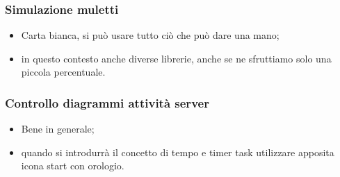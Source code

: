     \subsubsection{Simulazione muletti}
        \begin{itemize}
            \item Carta bianca, si può usare tutto ciò che può dare una mano;
            \item in questo contesto anche diverse librerie, anche se ne sfruttiamo solo  una piccola percentuale.
        \end{itemize}

    \subsubsection{Controllo diagrammi attività server}
        \begin{itemize}
            \item Bene in generale;
            \item quando si introdurrà il concetto di tempo e timer task utilizzare apposita icona start con orologio.
        \end{itemize}


